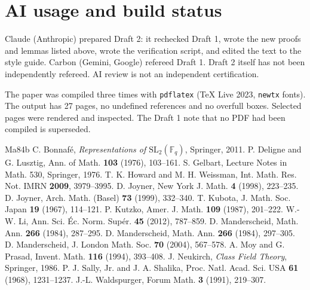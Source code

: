 \documentclass[12pt,letterpaper]{article}
\begin{document}
\section{AI usage and build status}
Claude (Anthropic) prepared Draft 2: it rechecked Draft 1, wrote the new proofs and lemmas listed above, wrote the verification script, and edited the text to the style guide. Carbon (Gemini, Google) refereed Draft 1. Draft 2 itself has not been independently refereed. AI review is not an independent certification.

The paper was compiled three times with \texttt{pdflatex} (TeX Live 2023, \texttt{newtx} fonts). The output has 27 pages, no undefined references and no overfull boxes. Selected pages were rendered and inspected. The Draft 1 note that no PDF had been compiled is superseded.

\begin{thebibliography}{Ma84b}
 C. Bonnaf\'e, \emph{Representations of $\mathrm{SL}_2(\mathbb F_q)$}, Springer, 2011.
 P. Deligne and G. Lusztig, Ann. of Math. \textbf{103} (1976), 103--161.
 S. Gelbart, Lecture Notes in Math. 530, Springer, 1976.
 T. K. Howard and M. H. Weissman, Int. Math. Res. Not. IMRN \textbf{2009}, 3979--3995.
 D. Joyner, New York J. Math. \textbf{4} (1998), 223--235.
 D. Joyner, Arch. Math. (Basel) \textbf{73} (1999), 332--340.
 T. Kubota, J. Math. Soc. Japan \textbf{19} (1967), 114--121.
 P. Kutzko, Amer. J. Math. \textbf{109} (1987), 201--222.
 W.-W. Li, Ann. Sci. \'Ec. Norm. Sup\'er. \textbf{45} (2012), 787--859.
 D. Manderscheid, Math. Ann. \textbf{266} (1984), 287--295.
 D. Manderscheid, Math. Ann. \textbf{266} (1984), 297--305.
 D. Manderscheid, J. London Math. Soc. \textbf{70} (2004), 567--578.
 A. Moy and G. Prasad, Invent. Math. \textbf{116} (1994), 393--408.
 J. Neukirch, \emph{Class Field Theory}, Springer, 1986.
 P. J. Sally, Jr. and J. A. Shalika, Proc. Natl. Acad. Sci. USA \textbf{61} (1968), 1231--1237.
 J.-L. Waldspurger, Forum Math. \textbf{3} (1991), 219--307.
\end{thebibliography}
\end{document}
